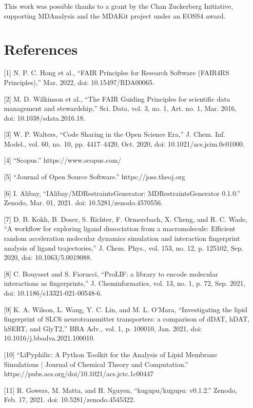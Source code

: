 \documentclass{article}
\begin{document}
This work was possible thanks to a grant by the Chan Zuckerberg Initiative, supporting MDAnalysis and the MDAKit project under an EOSS4 award.

\section{References}

[1]    N. P. C. Hong et al., “FAIR Principles for Research Software (FAIR4RS Principles),” Mar. 2022, doi: 10.15497/RDA00065.

[2]    M. D. Wilkinson et al., “The FAIR Guiding Principles for scientific data management and stewardship,” Sci. Data, vol. 3, no. 1, Art. no. 1, Mar. 2016, doi: 10.1038/sdata.2016.18.

[3]    W. P. Walters, “Code Sharing in the Open Science Era,” J. Chem. Inf. Model., vol. 60, no. 10, pp. 4417–4420, Oct. 2020, doi: 10.1021/acs.jcim.0c01000.

[4]    “Scopus.” https://www.scopus.com/

[5]    “Journal of Open Source Software.” https://joss.theoj.org

[6]    I. Alibay, “IAlibay/MDRestraintsGenerator: MDRestraintsGenerator 0.1.0.” Zenodo, Mar. 01, 2021. doi: 10.5281/zenodo.4570556.

[7]    D. B. Kokh, B. Doser, S. Richter, F. Ormersbach, X. Cheng, and R. C. Wade, “A workflow for exploring ligand dissociation from a macromolecule: Efficient random acceleration molecular dynamics simulation and interaction fingerprint analysis of ligand trajectories,” J. Chem. Phys., vol. 153, no. 12, p. 125102, Sep. 2020, doi: 10.1063/5.0019088.

[8]    C. Bouysset and S. Fiorucci, “ProLIF: a library to encode molecular interactions as fingerprints,” J. Cheminformatics, vol. 13, no. 1, p. 72, Sep. 2021, doi: 10.1186/s13321-021-00548-6.

[9]    K. A. Wilson, L. Wang, Y. C. Lin, and M. L. O’Mara, “Investigating the lipid fingerprint of SLC6 neurotransmitter transporters: a comparison of dDAT, hDAT, hSERT, and GlyT2,” BBA Adv., vol. 1, p. 100010, Jan. 2021, doi: 10.1016/j.bbadva.2021.100010.

[10]    “LiPyphilic: A Python Toolkit for the Analysis of Lipid Membrane Simulations | Journal of Chemical Theory and Computation.” https://pubs.acs.org/doi/10.1021/acs.jctc.1c00447

[11]    R. Gowers, M. Matta, and H. Nguyen, “kugupu/kugupu: v0.1.2.” Zenodo, Feb. 17, 2021. doi: 10.5281/zenodo.4545322.
\end{document}
